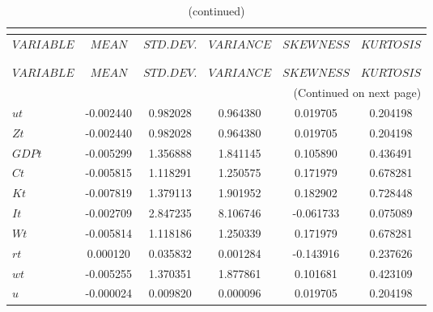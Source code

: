  
\begin{center}
\begin{longtable}{lccccc} 
\caption{MOMENTS OF SIMULATED VARIABLES}\\
 \label{Table:sim_moments}\\
\toprule 
$VARIABLE  $	 & 	 $            MEAN$	 & 	 $       STD. DEV.$	 & 	 $        VARIANCE$	 & 	 $        SKEWNESS$	 & 	 $        KURTOSIS$\\
\midrule \endfirsthead 
\caption{(continued)}\\
 \toprule \\ 
$VARIABLE  $	 & 	 $            MEAN$	 & 	 $       STD. DEV.$	 & 	 $        VARIANCE$	 & 	 $        SKEWNESS$	 & 	 $        KURTOSIS$\\
\midrule \endhead 
\midrule \multicolumn{6}{r}{(Continued on next page)} \\ \bottomrule \endfoot 
\bottomrule \endlastfoot 
$ut        $	 & 	       -0.002440	 & 	        0.982028	 & 	        0.964380	 & 	        0.019705	 & 	        0.204198 \\ 
$Zt        $	 & 	       -0.002440	 & 	        0.982028	 & 	        0.964380	 & 	        0.019705	 & 	        0.204198 \\ 
$GDPt      $	 & 	       -0.005299	 & 	        1.356888	 & 	        1.841145	 & 	        0.105890	 & 	        0.436491 \\ 
$Ct        $	 & 	       -0.005815	 & 	        1.118291	 & 	        1.250575	 & 	        0.171979	 & 	        0.678281 \\ 
$Kt        $	 & 	       -0.007819	 & 	        1.379113	 & 	        1.901952	 & 	        0.182902	 & 	        0.728448 \\ 
$It        $	 & 	       -0.002709	 & 	        2.847235	 & 	        8.106746	 & 	       -0.061733	 & 	        0.075089 \\ 
$Wt        $	 & 	       -0.005814	 & 	        1.118186	 & 	        1.250339	 & 	        0.171979	 & 	        0.678281 \\ 
$rt        $	 & 	        0.000120	 & 	        0.035832	 & 	        0.001284	 & 	       -0.143916	 & 	        0.237626 \\ 
$wt        $	 & 	       -0.005255	 & 	        1.370351	 & 	        1.877861	 & 	        0.101681	 & 	        0.423109 \\ 
$u         $	 & 	       -0.000024	 & 	        0.009820	 & 	        0.000096	 & 	        0.019705	 & 	        0.204198 \\ 

\end{longtable}
\end{center}
